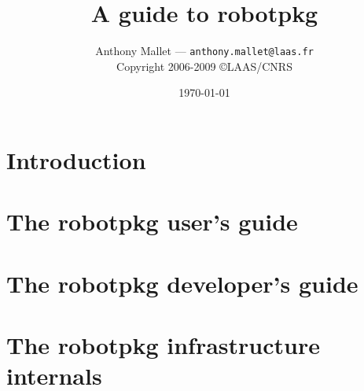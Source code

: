 \documentclass[a4paper,11pt]{book}
\title{A guide to robotpkg}
\author{
   Anthony Mallet --- {\tt anthony.mallet@laas.fr}\\[1em]
   Copyright 2006-2009 \copyright LAAS/CNRS
}
\date{\today}
\begin{document}

\frontmatter
\maketitle
\tableofcontents
\mainmatter

\chapter{Introduction}
\label{chapter:introduction}


\chapter{The robotpkg user's guide}
\label{chapter:user}





\chapter{The robotpkg developer's guide}
\label{chapter:developer}

\chapter{The robotpkg infrastructure internals}
\label{chapter:internal}
\end{document}
